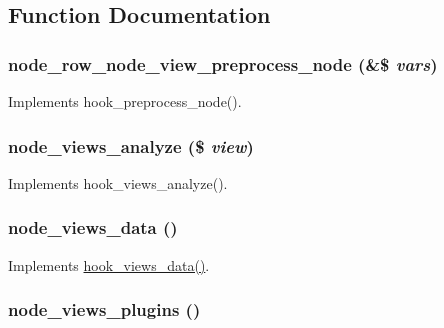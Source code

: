 \subsection{Function Documentation}
\hypertarget{node_8views_8inc_ac9a8871975d77054c1ba15c283398493}{
\subsubsection[{node\_\-row\_\-node\_\-view\_\-preprocess\_\-node}]{\setlength{\rightskip}{0pt plus 5cm}node\_\-row\_\-node\_\-view\_\-preprocess\_\-node (\&\$ {\em vars})}}
\label{node_8views_8inc_ac9a8871975d77054c1ba15c283398493}
Implements hook\_\-preprocess\_\-node(). \hypertarget{node_8views_8inc_a6060098a01aedf1a74dba4720f806654}{
\subsubsection[{node\_\-views\_\-analyze}]{\setlength{\rightskip}{0pt plus 5cm}node\_\-views\_\-analyze (\$ {\em view})}}
\label{node_8views_8inc_a6060098a01aedf1a74dba4720f806654}
Implements hook\_\-views\_\-analyze(). \hypertarget{node_8views_8inc_a5e6beb23be547a792dba68f1066d4b9d}{
\subsubsection[{node\_\-views\_\-data}]{\setlength{\rightskip}{0pt plus 5cm}node\_\-views\_\-data ()}}
\label{node_8views_8inc_a5e6beb23be547a792dba68f1066d4b9d}
Implements \hyperlink{group__views__hooks_ga227057901681e4a33e33c199c7a8c989}{hook\_\-views\_\-data()}. \hypertarget{node_8views_8inc_abad6697258bb04f10bbb73608ab1f52c}{
\subsubsection[{node\_\-views\_\-plugins}]{\setlength{\rightskip}{0pt plus 5cm}node\_\-views\_\-plugins ()}}
